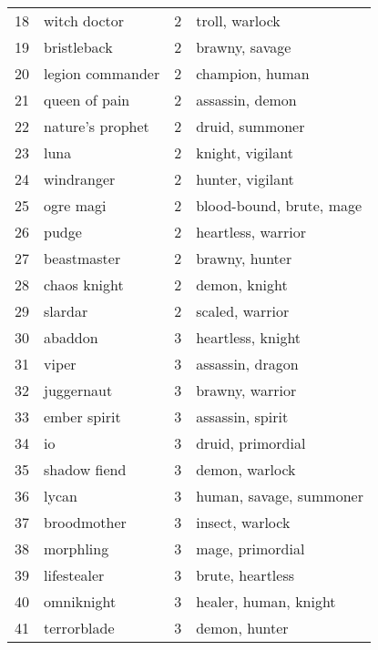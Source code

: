 \documentclass[smallextended]{svjour3}       %
\begin{document}
\begin{table}
{\begin{tabular}{llrl}
18 &         witch doctor &      2 &                troll, warlock  \\
19 &          bristleback &      2 &                 brawny, savage \\
20 &     legion commander &      2 &                champion, human \\
21 &        queen of pain &      2 &                assassin, demon \\
22 &     nature's prophet &      2 &                druid, summoner \\
23 &                 luna &      2 &               knight, vigilant \\
24 &           windranger &      2 &               hunter, vigilant \\
25 &            ogre magi &      2 &       blood-bound, brute, mage \\
26 &                pudge &      2 &            heartless, warrior  \\
27 &          beastmaster &      2 &                 brawny, hunter \\
28 &         chaos knight &      2 &                  demon, knight \\
29 &              slardar &      2 &               scaled, warrior  \\
30 &              abaddon &      3 &              heartless, knight \\
31 &                viper &      3 &               assassin, dragon \\
32 &           juggernaut &      3 &               brawny, warrior  \\
33 &         ember spirit &      3 &               assassin, spirit \\
34 &                   io &      3 &              druid, primordial \\
35 &         shadow fiend &      3 &                demon, warlock  \\
36 &                lycan &      3 &        human, savage, summoner \\
37 &          broodmother &      3 &               insect, warlock  \\
38 &            morphling &      3 &               mage, primordial \\
39 &          lifestealer &      3 &               brute, heartless \\
40 &           omniknight &      3 &          healer, human, knight \\
41 &          terrorblade &      3 &                  demon, hunter \\

\end{tabular}}
\end{table}
\end{document}
